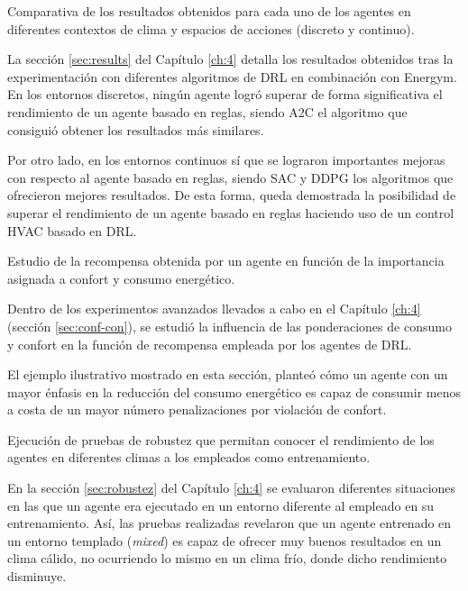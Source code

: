 \begin{tcolorbox}[colbacktitle=green!30!white, title=Subobjetivo 4, coltitle=black, fonttitle=\bfseries]
Comparativa de los resultados obtenidos para cada uno de los agentes en diferentes contextos de clima y espacios de acciones (discreto y continuo).
\end{tcolorbox}

La sección \ref{sec:results} del Capítulo \ref{ch:4} detalla los resultados obtenidos tras la experimentación con diferentes algoritmos de DRL en combinación con Energym. En los entornos discretos, ningún agente logró superar de forma significativa el rendimiento de un agente basado en reglas, siendo A2C el algoritmo que consiguió obtener los resultados más similares. 

Por otro lado, en los entornos continuos sí que se lograron importantes mejoras con respecto al agente basado en reglas, siendo SAC y DDPG los algoritmos que ofrecieron mejores resultados. De esta forma, queda demostrada la posibilidad de superar el rendimiento de un agente basado en reglas haciendo uso de un control HVAC basado en DRL.

\begin{tcolorbox}[colbacktitle=green!30!white, title=Subobjetivo 5, coltitle=black, fonttitle=\bfseries]
Estudio de la recompensa obtenida por un agente en función de la importancia asignada a confort y consumo energético.
\end{tcolorbox}

Dentro de los experimentos avanzados llevados a cabo en el Capítulo \ref{ch:4} (sección \ref{sec:conf-con}), se estudió la influencia de las ponderaciones de consumo y confort en la función de recompensa empleada por los agentes de DRL. 

El ejemplo ilustrativo mostrado en esta sección, planteó cómo un agente con un mayor énfasis en la reducción del consumo energético es capaz de consumir menos a costa de un mayor número penalizaciones por violación de confort.

\begin{tcolorbox}[colbacktitle=green!30!white, title=Subobjetivo 5, coltitle=black, fonttitle=\bfseries]
Ejecución de pruebas de robustez que permitan conocer el rendimiento de los agentes en diferentes climas a los empleados como entrenamiento.
\end{tcolorbox}

En la sección \ref{sec:robustez} del Capítulo \ref{ch:4} se evaluaron diferentes situaciones en las que un agente era ejecutado en un entorno diferente al empleado en su entrenamiento. Así, las pruebas realizadas revelaron que un agente entrenado en un entorno templado (\textit{mixed}) es capaz de ofrecer muy buenos resultados en un clima cálido, no ocurriendo lo mismo en un clima frío, donde dicho rendimiento disminuye.

